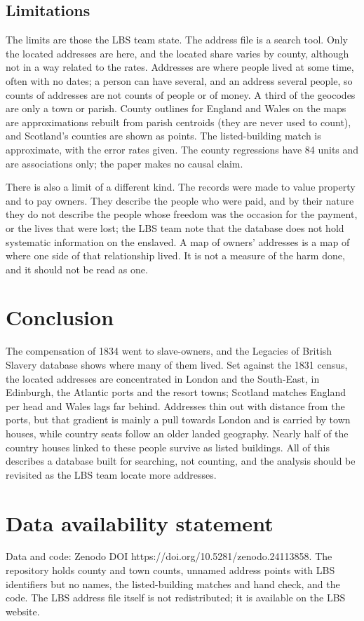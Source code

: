 \documentclass[11pt,a4paper]{article}
\begin{document}
\subsection{Limitations}
The limits are those the LBS team state. The address file is a search tool. Only the located addresses are here, and the located share varies by county, although not in a way related to the rates. Addresses are where people lived at some time, often with no dates; a person can have several, and an address several people, so counts of addresses are not counts of people or of money. A third of the geocodes are only a town or parish. County outlines for England and Wales on the maps are approximations rebuilt from parish centroids (they are never used to count), and Scotland's counties are shown as points. The listed-building match is approximate, with the error rates given. The county regressions have 84 units and are associations only; the paper makes no causal claim.

There is also a limit of a different kind. The records were made to value property and to pay owners. They describe the people who were paid, and by their nature they do not describe the people whose freedom was the occasion for the payment, or the lives that were lost; the LBS team note that the database does not hold systematic information on the enslaved. A map of owners' addresses is a map of where one side of that relationship lived. It is not a measure of the harm done, and it should not be read as one.

\section{Conclusion}\label{sec:conc}
The compensation of 1834 went to slave-owners, and the Legacies of British Slavery database shows where many of them lived. Set against the 1831 census, the located addresses are concentrated in London and the South-East, in Edinburgh, the Atlantic ports and the resort towns; Scotland matches England per head and Wales lags far behind. Addresses thin out with distance from the ports, but that gradient is mainly a pull towards London and is carried by town houses, while country seats follow an older landed geography. Nearly half of the country houses linked to these people survive as listed buildings. All of this describes a database built for searching, not counting, and the analysis should be revisited as the LBS team locate more addresses.

\section*{Data availability statement}
Data and code: Zenodo DOI https://doi.org/10.5281/zenodo.24113858. The repository holds county and town counts, unnamed address points with LBS identifiers but no names, the listed-building matches and hand check, and the code. The LBS address file itself is not redistributed; it is available on the LBS website.
\end{document}
